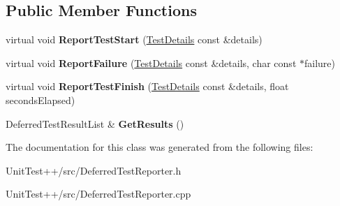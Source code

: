 \subsection*{Public Member Functions}
\begin{DoxyCompactItemize}
\item 
\hypertarget{classUnitTest_1_1DeferredTestReporter_a52d0919400bafb36de8299796d7e8307}{virtual void {\bfseries Report\-Test\-Start} (\hyperlink{classUnitTest_1_1TestDetails}{Test\-Details} const \&details)}\label{classUnitTest_1_1DeferredTestReporter_a52d0919400bafb36de8299796d7e8307}

\item 
\hypertarget{classUnitTest_1_1DeferredTestReporter_aa2712651e2c604a5617549e53a9d1de8}{virtual void {\bfseries Report\-Failure} (\hyperlink{classUnitTest_1_1TestDetails}{Test\-Details} const \&details, char const $\ast$failure)}\label{classUnitTest_1_1DeferredTestReporter_aa2712651e2c604a5617549e53a9d1de8}

\item 
\hypertarget{classUnitTest_1_1DeferredTestReporter_a3934cb4f1cb78b855509b25287162b43}{virtual void {\bfseries Report\-Test\-Finish} (\hyperlink{classUnitTest_1_1TestDetails}{Test\-Details} const \&details, float seconds\-Elapsed)}\label{classUnitTest_1_1DeferredTestReporter_a3934cb4f1cb78b855509b25287162b43}

\item 
\hypertarget{classUnitTest_1_1DeferredTestReporter_a686cb7bc67901795f57d49273a80bf89}{Deferred\-Test\-Result\-List \& {\bfseries Get\-Results} ()}\label{classUnitTest_1_1DeferredTestReporter_a686cb7bc67901795f57d49273a80bf89}

\end{DoxyCompactItemize}


The documentation for this class was generated from the following files\-:\begin{DoxyCompactItemize}
\item 
Unit\-Test++/src/Deferred\-Test\-Reporter.\-h\item 
Unit\-Test++/src/Deferred\-Test\-Reporter.\-cpp\end{DoxyCompactItemize}

